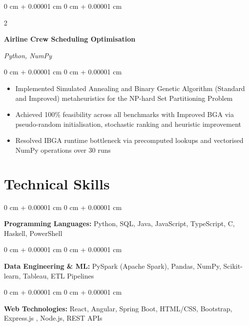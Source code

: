 \documentclass[10pt, a4paper]{article}
\newenvironment{highlights}{
    \begin{itemize}[
        topsep=0.10 cm,
        parsep=0.10 cm,
        partopsep=0pt,
        itemsep=0pt,
        leftmargin=20pt
    ]
}{
    \end{itemize}
} %
\newenvironment{onecolentry}{
    \begin{adjustwidth}{
        0 cm + 0.00001 cm
    }{
        0 cm + 0.00001 cm
    }
}{
    \end{adjustwidth}
} %
\newenvironment{twocolentry}[2][]{
    \onecolentry
    \def\secondColumn{#2}
    \setcolumnwidth{\fill, 4.5 cm}
    \begin{paracol}{2}
}{
    \switchcolumn \raggedleft \secondColumn
    \end{paracol}
    \endonecolentry
} %
\begin{document}
    \vspace{0.10 cm}

    \begin{twocolentry}{
        \textit{Python, NumPy}
    }
        \textbf{Airline Crew Scheduling Optimisation}
    \end{twocolentry}

    \vspace{0.10 cm}
    \begin{onecolentry}
        \begin{highlights}
            \item Implemented Simulated Annealing and Binary Genetic Algorithm (Standard and Improved) metaheuristics for the NP-hard Set Partitioning Problem
            \item Achieved 100\% feasibility across all benchmarks with Improved BGA via pseudo-random initialisation, stochastic ranking and heuristic improvement
            \item Resolved IBGA runtime bottleneck via precomputed lookups and vectorised NumPy operations over 30 runs
        \end{highlights}
    \end{onecolentry}

    \section{Technical Skills}

    \begin{onecolentry}
        \textbf{Programming Languages:} Python, SQL, Java, JavaScript, TypeScript, C, Haskell, PowerShell
    \end{onecolentry}

    \vspace{0.2 cm}

    \begin{onecolentry}
        \textbf{Data Engineering \& ML:} PySpark (Apache Spark), Pandas, NumPy, Scikit-learn, Tableau, ETL Pipelines
    \end{onecolentry}

    \vspace{0.2 cm}

    \begin{onecolentry}
        \textbf{Web Technologies:} React, Angular, Spring Boot, HTML/CSS, Bootstrap, Express.js , Node.js, REST APIs
    \end{onecolentry}

    \vspace{0.2 cm}
\end{document}
